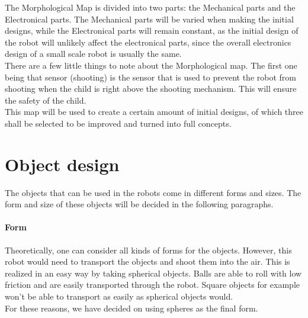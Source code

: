 \documentclass[11pt,twoside,a4paper]{report}
\begin{document}
The Morphological Map is divided into two parts: the Mechanical parts and the Electronical parts. The Mechanical parts will be varied when making the initial designs, while the Electronical parts will remain constant, as the initial design of the robot will unlikely affect the electronical parts, since the overall electronics design of a small scale robot is usually the same. \\
There are a few little things to note about the Morphological map. The first one being that sensor (shooting) is the sensor that is used to prevent the robot from shooting when the child is right above the shooting mechanism. This will ensure the safety of the child. \\
This map will be used to create a certain amount of initial designs, of which three shall be selected to be improved and turned into full concepts.


\chapter{Object design}
The objects that can be used in the robots come in different forms and sizes. The form and size of these objects will be decided in the following paragraphs. 

\subsubsection{Form}
Theoretically, one can consider all kinds of forms for the objects. However, this robot would need to transport the objects and shoot them into the air. This is realized in an easy way by taking spherical objects. Balls are able to roll with low friction and are easily transported through the robot. Square objects for example won\rq{}t be able to transport as easily as spherical objects would. \\
For these reasons, we have decided on using spheres as the final form.
\end{document}
